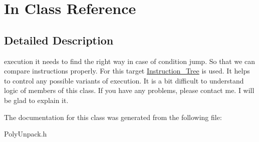 \hypertarget{classIn}{
\section{In Class Reference}
\label{classIn}
}


\subsection{Detailed Description}
execution it needs to find the right way in case of condition jump. So that we can compare instructions properly. For this target \hyperlink{classInstruction__Tree}{Instruction\_\-Tree} is used. It helps to control any possible variants of execution. It is a bit difficult to understand logic of members of this class. If you have any problems, please contact me. I will be glad to explain it. 

The documentation for this class was generated from the following file:\begin{DoxyCompactItemize}
\item 
PolyUnpack.h\end{DoxyCompactItemize}
